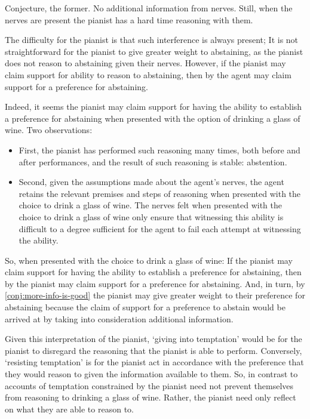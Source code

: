 \begin{note}
{    Conjecture, the former.
    No additional information from nerves.
    Still, when the nerves are present the pianist has a hard time reasoning with them.
  }

  The difficulty for the pianist is that such interference is always present;
  It is not straightforward for the pianist to give greater weight to abstaining, as the pianist does not reason to abstaining given their nerves.
  However, if the pianist may claim support for  ability to reason to abstaining, then by \EAS{} the agent may claim support for a preference for abstaining.

  Indeed, it seems the pianist may claim support for having the ability to establish a preference for abstaining when presented with the option of drinking a glass of wine.
  Two observations:
  \begin{itemize}
  \item First, the pianist has performed such reasoning many times, both before and after performances, and the result of such reasoning is stable: abstention.
  \item Second, given the assumptions made about the agent's nerves, the agent retains the relevant premises and steps of reasoning when presented with the choice to drink a glass of wine.
    The nerves felt when presented with the choice to drink a glass of wine only ensure that witnessing this ability is difficult to a degree sufficient for the agent to fail each attempt at witnessing the ability.
  \end{itemize}

  So, when presented with the choice to drink a glass of wine:
  If the  pianist may claim support for having the ability to establish a preference for abstaining, then by \EAS{} the pianist may claim support for a preference for abstaining.
  And, in turn, by \autoref{conj:more-info-is-good} the pianist may give greater weight to their preference for abstaining because the claim of support for a preference to abstain would be arrived at by taking into consideration additional information.

  Given this interpretation of the pianist, `giving into temptation' would be for the pianist to disregard the reasoning that the pianist is able to perform.
  Conversely, `resisting temptation' is for the pianist act in accordance with the preference that they would reason to given the information available to them.
  So, in contrast to accounts of temptation constrained by \ESU{} the pianist need not prevent themselves from reasoning to drinking a glass of wine.
  Rather, the pianist need only reflect on what they are able to reason to.
\end{note}

